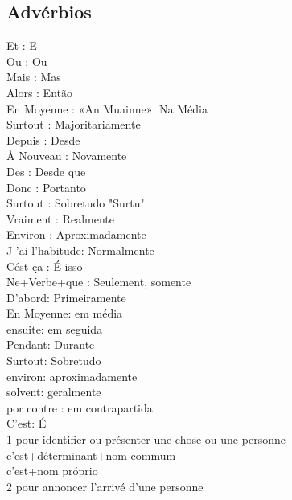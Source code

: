 \documentclass{article}
\begin{document}
    \subsection{Advérbios}
                       Et            : E\\
                       Ou            : Ou\\
                       Mais          : Mas\\
                       Alors         : Então\\
                  En   Moyenne       : «An Muainne»: Na Média\\
                       Surtout       : Majoritariamente\\
                       Depuis        : Desde\\
                  À    Nouveau       : Novamente\\
                       Des           : Desde que\\
                       Donc          : Portanto\\
                       Surtout       : Sobretudo "Surtu"\\
                       Vraiment      : Realmente\\
                       Environ       : Aproximadamente\\
                  J    'ai l'habitude: Normalmente\\
                  Cést ça            : É isso\\
                       Ne+Verbe+que  : Seulement,    somente\\
        D'abord: Primeiramente\\
        En  Moyenne: em média\\
            ensuite: em seguida\\
            Pendant: Durante\\
            Surtout: Sobretudo\\
            environ: aproximadamente\\
            solvent: geralmente\\
        por contre : em contrapartida\\
        C'est: É\\
         1 pour identifier ou présenter une chose ou une personne\\
          c'est+déterminant+nom commum\\
          c'est+nom próprio\\
         2 pour annoncer l'arrivé d'une personne\\
\end{document}
